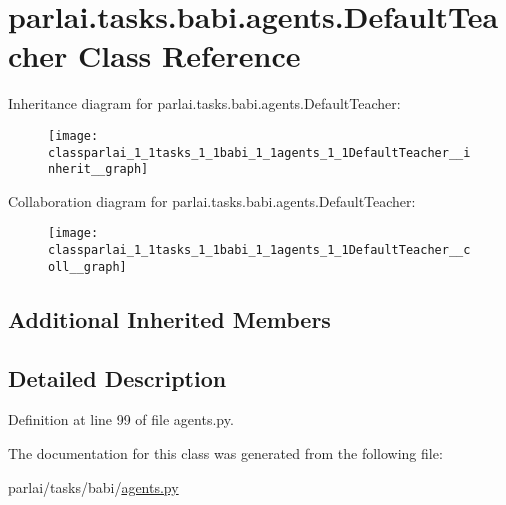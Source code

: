 \hypertarget{classparlai_1_1tasks_1_1babi_1_1agents_1_1DefaultTeacher}{}\section{parlai.\+tasks.\+babi.\+agents.\+Default\+Teacher Class Reference}
\label{classparlai_1_1tasks_1_1babi_1_1agents_1_1DefaultTeacher}


Inheritance diagram for parlai.\+tasks.\+babi.\+agents.\+Default\+Teacher\+:
\nopagebreak
\begin{figure}[H]
\begin{center}
\leavevmode
\texttt{[image: classparlai\_1\_1tasks\_1\_1babi\_1\_1agents\_1\_1DefaultTeacher\_\_inherit\_\_graph]}
\end{center}
\end{figure}


Collaboration diagram for parlai.\+tasks.\+babi.\+agents.\+Default\+Teacher\+:
\nopagebreak
\begin{figure}[H]
\begin{center}
\leavevmode
\texttt{[image: classparlai\_1\_1tasks\_1\_1babi\_1\_1agents\_1\_1DefaultTeacher\_\_coll\_\_graph]}
\end{center}
\end{figure}
\subsection*{Additional Inherited Members}


\subsection{Detailed Description}


Definition at line 99 of file agents.\+py.



The documentation for this class was generated from the following file\+:\begin{DoxyCompactItemize}
\item 
parlai/tasks/babi/\hyperlink{parlai_2tasks_2babi_2agents_8py}{agents.\+py}\end{DoxyCompactItemize}
